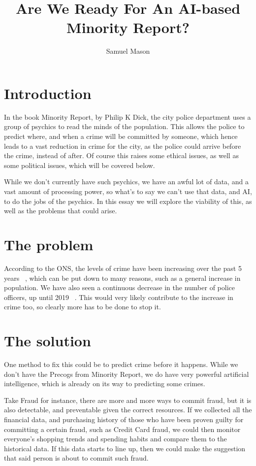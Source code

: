 \documentclass[12pt]{amsart}
\title{Are We Ready For An AI-based Minority Report?}
\author{Samuel Mason}
\begin{document}
    \maketitle
    \tableofcontents


    \section{Introduction}\label{sec:introduction}

    In the book Minority Report, by Philip K Dick, the city police department uses a group of psychics to read
    the minds of the population.
    This allows the police to predict where, and when a crime will be committed by someone, which hence leads to a vast
    reduction in crime for the city, as the police could arrive before the crime, instead of after.
    Of course this raises some ethical issues, as well as some political issues, which will be covered below.

    While we don't currently have such psychics, we have an awful lot of data, and a vast amount of processing power, so
    what's to say we can't use that data, and AI, to do the jobs of the psychics.
    In this essay we will explore the viability of this, as well as the problems that could arise.

    \section{The problem}\label{sec:the-problem}

    According to the ONS, the levels of crime have been increasing over the past 5 years ~\cite{ons-crime}, which can be
    put down to many reasons, such as a general increase in population.
    We have also seen a continuous decrease in the number of police officers, up until 2019 ~\cite{ho-pw}.
    This would very likely contribute to the increase in crime too, so clearly more has to be done to stop it.

    \section{The solution}\label{sec:the-solution}

    One method to fix this could be to predict crime before it happens.
    While we don't have the Precogs from Minority Report, we do have very powerful artificial intelligence, which is
    already on its way to predicting some crimes.

    Take Fraud for instance, there are more and more ways to commit fraud, but it is also detectable, and preventable
    given the correct resources.
    If we collected all the financial data, and purchasing history of those who have been proven guilty for
    committing a certain fraud, such as Credit Card fraud, we could then monitor everyone's shopping trends and spending
    habits and compare them to the historical data.
    If this data starts to line up, then we could make the suggestion that said person is about to commit such fraud.
\end{document}
